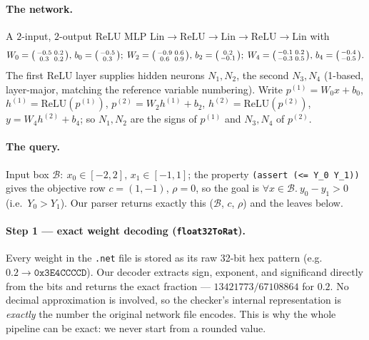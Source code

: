 \documentclass[runningheads]{llncs}
\newcommand{\dom}{\mathcal{B}}          %
\newcommand{\relu}{\ensuremath{\mathrm{ReLU}}}
\newcommand{\code}[1]{\texttt{#1}}
\begin{document}
\paragraph{The network.} A $2$-input, $2$-output ReLU MLP
$\mathrm{Lin}\!\to\!\relu\!\to\!\mathrm{Lin}\!\to\!\relu\!\to\!\mathrm{Lin}$ with
\[
W_0=\begin{psmallmatrix}-0.5&0.2\\ 0.3&0.2\end{psmallmatrix},\,
b_0=\begin{psmallmatrix}-0.5\\ 0.3\end{psmallmatrix};\;
W_2=\begin{psmallmatrix}-0.9&0.6\\ 0.6&0.9\end{psmallmatrix},\,
b_2=\begin{psmallmatrix}0.2\\ -0.1\end{psmallmatrix};\;
W_4=\begin{psmallmatrix}-0.1&0.2\\ -0.3&0.5\end{psmallmatrix},\,
b_4=\begin{psmallmatrix}-0.4\\ -0.5\end{psmallmatrix}.
\]
The first \relu{} layer supplies hidden neurons $N_1,N_2$, the second $N_3,N_4$
(1-based, layer-major, matching the reference variable numbering). Write
$p^{(1)}=W_0x+b_0$, $h^{(1)}=\relu(p^{(1)})$, $p^{(2)}=W_2h^{(1)}+b_2$,
$h^{(2)}=\relu(p^{(2)})$, $y=W_4h^{(2)}+b_4$; so $N_1,N_2$ are the signs of
$p^{(1)}$ and $N_3,N_4$ of $p^{(2)}$.

\paragraph{The query.} Input box $\dom:\ x_0\in[-2,2],\,x_1\in[-1,1]$; the property
\code{(assert (<= Y\_0 Y\_1))} gives the objective row $c=(1,-1)$, $\rho=0$, so the
goal is $\forall x\in\dom.\ y_0-y_1>0$ (i.e.\ $Y_0>Y_1$). Our parser returns exactly
this ($\dom$, $c$, $\rho$) and the leaves below.

\paragraph{Step 1 --- exact weight decoding (\code{float32ToRat}).}
Every weight in the \code{.net} file is stored as its raw 32-bit hex pattern (e.g.\
$0.2 \to \mathtt{0x3E4CCCCD}$). Our decoder extracts sign, exponent, and significand
directly from the bits and returns the exact fraction --- $13421773/67108864$ for
$0.2$. No decimal approximation is involved, so the checker's internal representation
is \emph{exactly} the number the original network file encodes. This is why the whole
pipeline can be exact: we never start from a rounded value.
\end{document}
